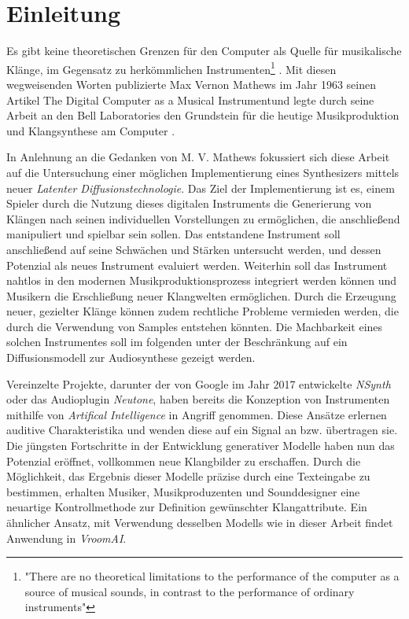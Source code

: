\documentclass[
  a4paper,  %
  twoside,  %
  bibliography=totoc,
  headsepline,
  cleardoublepage=empty,
  parskip=half,
  draft=false
]{scrbook}
\begin{document}
%
%


\chapter{Einleitung}
\label{sec:introduction}

\glqq Es gibt keine theoretischen Grenzen für den Computer als Quelle für musikalische Klänge, im Gegensatz zu herkömmlichen Instrumenten\grqq \footnote{"There are no theoretical limitations to the performance of the computer as a source of musical sounds, in contrast to the performance of ordinary instruments"} \cite{mathews_digital_1963}. Mit diesen wegweisenden Worten publizierte Max Vernon Mathews im Jahr 1963 seinen Artikel \glqq The Digital Computer as a Musical Instrument\grqq und legte durch seine Arbeit an den Bell Laboratories den Grundstein für die heutige Musikproduktion und Klangsynthese am Computer \cite{mathews_music_2004}.

In Anlehnung an die Gedanken von M. V. Mathews fokussiert sich diese Arbeit auf die Untersuchung einer möglichen Implementierung eines Synthesizers mittels neuer \emph{Latenter Diffusionstechnologie}. Das Ziel der Implementierung ist es, einem Spieler durch die Nutzung dieses digitalen Instruments die Generierung von Klängen nach seinen individuellen Vorstellungen zu ermöglichen, die anschließend manipuliert und spielbar sein sollen. Das entstandene Instrument soll anschließend auf seine Schwächen und Stärken untersucht werden, und dessen Potenzial als neues Instrument evaluiert werden. Weiterhin soll das Instrument nahtlos in den modernen Musikproduktionsprozess integriert werden können und Musikern die Erschließung neuer Klangwelten ermöglichen. Durch die Erzeugung neuer, gezielter Klänge können zudem rechtliche Probleme vermieden werden, die durch die Verwendung von Samples entstehen könnten. Die Machbarkeit eines solchen Instrumentes soll im folgenden unter der Beschränkung auf ein Diffusionsmodell zur Audiosynthese gezeigt werden.

Vereinzelte Projekte, darunter der von Google im Jahr 2017 entwickelte \emph{NSynth}\cite{google_ai_nsynth_2017} oder das Audioplugin \emph{Neutone}\cite{qosmo_neutone_nodate}, haben bereits die Konzeption von Instrumenten mithilfe von  \emph{Artifical Intelligence} in Angriff genommen. Diese Ansätze erlernen auditive Charakteristika und wenden diese auf ein Signal an bzw. übertragen sie. Die jüngsten Fortschritte in der Entwicklung generativer Modelle haben nun das Potenzial eröffnet, vollkommen neue Klangbilder zu erschaffen. Durch die Möglichkeit, das Ergebnis dieser Modelle präzise durch eine Texteingabe zu bestimmen, erhalten Musiker, Musikproduzenten und Sounddesigner eine neuartige Kontrollmethode zur Definition gewünschter Klangattribute. Ein ähnlicher Ansatz, mit Verwendung desselben Modells wie in dieser Arbeit findet Anwendung in \emph{VroomAI}\cite{barney_hill_vroomai_2023}.
\end{document}
